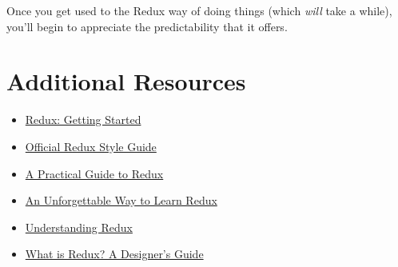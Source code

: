 Once you get used to the Redux way of doing things (which \textit{will} take a while), you'll begin to appreciate the predictability that it offers.


\section{Additional Resources}

\begin{itemize}[leftmargin=*]
    \item \href{https://redux.js.org/introduction/getting-started}{Redux: Getting Started}
    \item \href{https://redux.js.org/style-guide/style-guide}{Official Redux Style Guide}
    \item \href{https://lorenstewart.me/2016/11/27/a-practical-guide-to-redux/}{A Practical Guide to Redux}
    \item \href{https://levelup.gitconnected.com/an-unforgettable-way-to-learn-redux-f36afd38c966}{An Unforgettable Way to Learn Redux}
    \item \href{https://medium.freecodecamp.org/understanding-redux-the-worlds-easiest-guide-to-beginning-redux-c695f45546f6}{Understanding Redux}
    \item \href{https://www.smashingmagazine.com/2018/07/redux-designers-guide/}{What is Redux? A Designer's Guide}
\end{itemize}
